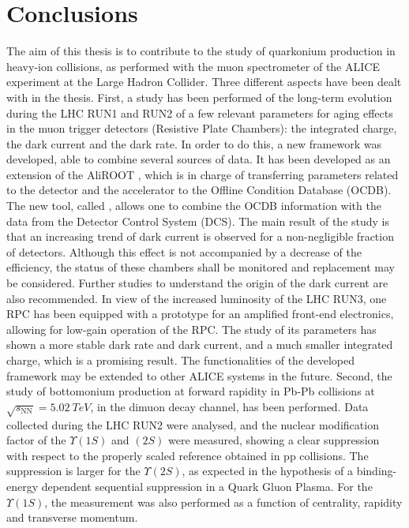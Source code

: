\chapter{Conclusions}
The aim of this thesis is to contribute to the study of quarkonium production in heavy-ion collisions, as performed with the muon spectrometer of the ALICE experiment at  the Large Hadron Collider. 
Three different aspects have been dealt with in the thesis.
First, a study has been performed of the long-term evolution during the LHC RUN1 and RUN2 of a few relevant parameters for aging effects in the muon trigger detectors (Resistive Plate Chambers): the integrated charge, the dark current and the dark rate. 
In order to do this, a new framework was developed, able to combine several sources of data. It has been developed as an extension of the AliROOT , which is in charge of transferring parameters related to the detector and the accelerator to the Offline Condition Database (OCDB). 
The new tool, called , allows one to combine the OCDB information with the data from the Detector Control System (DCS). 
The main result of the study is that an increasing trend of dark current is observed for a non-negligible fraction of detectors.
Although this effect is not accompanied by a decrease of the efficiency, the status of these chambers shall be monitored and replacement may be considered.
Further studies to understand the origin of the dark current are also recommended.
In view of the increased luminosity of the LHC RUN3, one RPC has been equipped with a prototype for an amplified front-end electronics, allowing for low-gain operation of the RPC. 
The study of its parameters has shown a more stable dark rate and dark current, and a much smaller integrated charge, which is a promising result. 
The functionalities of the developed framework may be extended to other ALICE systems in the future.
Second, the study of bottomonium production at forward rapidity in Pb-Pb collisions at $\sqrt{s_{\mathrm{NN}}}=5.02\ TeV$, in the dimuon decay channel, has been performed.
Data collected during the LHC RUN2 were analysed, and the nuclear modification factor of the $\Upsilon(1S)$ and $(2S)$ were measured, showing a clear suppression with respect to the properly scaled reference obtained in pp collisions. 
The suppression is larger for the $\Upsilon(2S)$, as expected in the hypothesis of a binding-energy dependent sequential suppression in a Quark Gluon Plasma. 
For the $\Upsilon(1S)$, the measurement was also performed as a function of centrality, rapidity and transverse momentum. 
